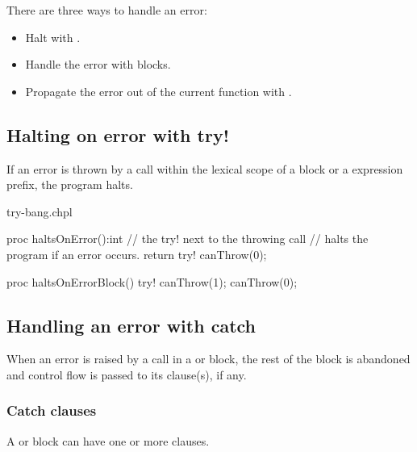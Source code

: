 There are three ways to handle an error:

\begin{itemize}
\item Halt with .
\item Handle the error with  blocks.
\item Propagate the error out of the current function with .
\end{itemize}


\subsection{Halting on error with try!}
\label{Halting_on_error_with_try_bang}

If an error is thrown by a call within the lexical scope of a 
block or a  expression prefix, the program halts.

\begin{chapelexample}{try-bang.chpl}
\begin{chapel}
proc haltsOnError():int {
  // the try! next to the throwing call
  // halts the program if an error occurs.
  return try! canThrow(0);
}

proc haltsOnErrorBlock() {
  try! {
    canThrow(1);
    canThrow(0);
  }
}
\end{chapel}
\begin{chapelpost}
\end{chapelpost}
\begin{chapeloutput}
\end{chapeloutput}
\end{chapelexample}

\subsection{Handling an error with catch}
\label{Handling_an_error_with_catch}

When an error is raised by a call in a  or  block,
the rest of the block is abandoned and control flow is passed
to its  clause(s), if any.

\subsubsection{Catch clauses}
\label{Catch_clauses}

A  or  block can have one or more  clauses.

